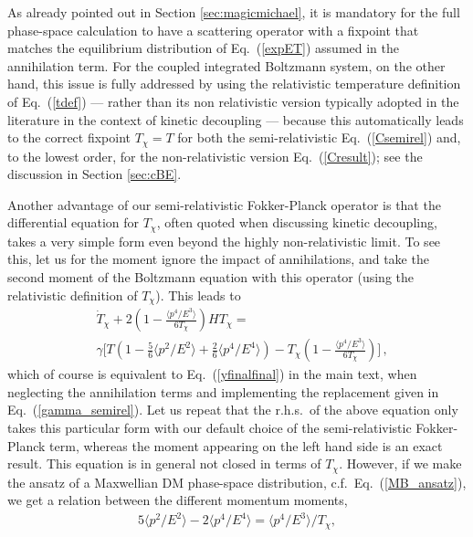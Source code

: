 \documentclass[twocolumn,showpacs,amsmath,amssymb,superscriptaddress,nofootinbib]{revtex4-1}
\begin{document}
As already pointed out in Section \ref{sec:magicmichael}, it is mandatory for the full phase-space 
calculation to have a scattering operator with a fixpoint that matches the equilibrium distribution of
Eq.~(\ref{expET}) assumed in the annihilation term. For the coupled integrated Boltzmann system, 
on the other hand, this issue is fully addressed by using the relativistic temperature definition of 
Eq.~(\ref{tdef}) --- rather than its non relativistic version typically adopted in the literature in the 
context of kinetic decoupling --- because this automatically leads to the correct fixpoint $T_\chi=T$ 
for both the semi-relativistic Eq.~(\ref{Csemirel}) and, to the lowest order, for the non-relativistic 
version Eq.~(\ref{Cresult}); see the discussion in Section \ref{sec:cBE}.


Another advantage of our semi-relativistic Fokker-Planck operator is that the differential equation for 
$T_\chi$, often quoted when discussing kinetic decoupling, takes a very simple form even 
beyond the highly non-relativistic limit.
To see this, let us for the moment ignore the impact of annihilations, and take the second moment of
the Boltzmann equation with this operator (using the relativistic definition of $T_\chi$).
This leads to 
\begin{align}
& \dot{T}_{\chi} + 2 \left(1- \frac{\langle p^4/E^3 \rangle}{6 T_{\chi}}\right) H T_{\chi}  = \\ 
& \gamma {\Bigg [} T \left(1- \frac{5}{6}\langle p^2/E^2\rangle + \frac{2}{6}\langle p^4/E^4\rangle \right)  - T_{\chi} \left(1- \frac{\langle p^4/E^3 \rangle}{6 T_{\chi}}\right){\Bigg ]}\,,\nonumber
\end{align}
which of course is equivalent to Eq.~(\ref{yfinalfinal}) in the main text, when neglecting the annihilation 
terms and implementing the replacement given in Eq.~(\ref{gamma_semirel}).
Let us repeat that the r.h.s.~of the above equation only takes this particular form with our default 
choice of the semi-relativistic Fokker-Planck 
term, whereas the moment appearing on the left hand side is an exact result. This equation is in 
general not closed in terms of $T_\chi$. 
However, if we make the ansatz of a Maxwellian DM phase-space distribution, 
c.f.~Eq.~(\ref{MB_ansatz}),  we get a relation between the different momentum moments,
\begin{align}
5 \langle p^2/E^2\rangle - 2 \langle p^4/E^4\rangle = {\langle p^4/E^3 \rangle}/{T_{\chi}},
\end{align}
\end{document}
